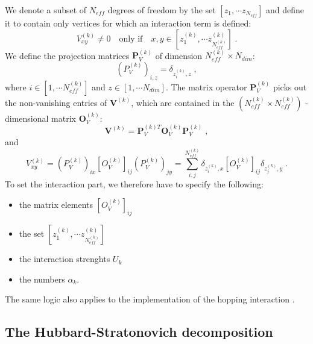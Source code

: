 We denote a subset of $N_{eff}$  degrees of freedom  by the set  $[z_{1},\cdots  z_{N_{eff}}]$ and define it to contain only vertices for which an interaction term is defined:
\begin{equation}
V^{(k)}_{x y}\neq 0\quad \text{only if} \quad x,y \in [z_{1}^{(k)},\cdots  z_{N_{eff}^{(k)}}^{(k)}]\;.
\end{equation}
We define the projection matrices $\mathbf{P}^{(k)}_{V}$ of dimension $N_{eff}^{(k)}\times N_{dim}$:
\begin{equation}
(P_{V}^{(k)})_{i,z}=\delta_{z_{i}^{(k)},z}\;,
\end{equation}
where $i\in [1,\cdots N_{eff}^{(k)}]$ and $z\in [1,\cdots N_{dim}]$. The matrix operator $\bm{P}^{(k)}_{V}$ picks out the non-vanishing entries of $\bm{V}^{(k)}$, 
which are contained in the $(N_{eff}^{(k)}\times N_{eff}^{(k)})$ - dimensional matrix $\bm{O}_{V}^{(k)}$:
\begin{equation}
\bm{V}^{(k)}=\bm{P}^{(k) T}_{V} \bm{O}_{V}^{(k)}\bm{P}^{(k)}_{V}\;,
\end{equation}
and
\begin{equation}
V_{xy}^{(k)}=(P^{(k)}_{V})_{ix} \left[O_{V}^{(k)}\right]_{ij}(P_{V}^{(k)})_{jy}=\sum\limits_{i,j}^{N_{eff}^{(k)}} \delta_{z_{i}^{(k)},x}  \left[O_{V}^{(k)}\right]_{ij} \delta_{z_{j}^{(k)},y} \;.
\end{equation}
To set the  interaction part, we therefore have to specify the following:
\begin{itemize}
\item the matrix elements $\left[O_{V}^{(k)}\right]_{ij}$
\item the set $[z_{1}^{(k)},\cdots  z_{N_{eff}^{(k)}}^{(k)}]$ 
\item the interaction strenghts $U_{k}$
\item the numbers  $\alpha_{k}$.
\end{itemize}

The same logic also applies to the implementation of the hopping interaction .

\subsection{The Hubbard-Stratonovich decomposition}

